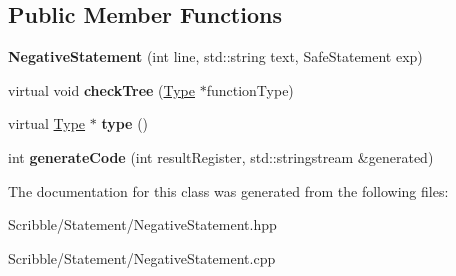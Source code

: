\subsection*{Public Member Functions}
\begin{DoxyCompactItemize}
\item 
\hypertarget{class_negative_statement_af9c7e2ba41fd73279c85fc9e79baed7c}{{\bfseries Negative\-Statement} (int line, std\-::string text, Safe\-Statement exp)}\label{class_negative_statement_af9c7e2ba41fd73279c85fc9e79baed7c}

\item 
\hypertarget{class_negative_statement_a8a3c065290681b616e95f4352cd80147}{virtual void {\bfseries check\-Tree} (\hyperlink{class_type}{Type} $\ast$function\-Type)}\label{class_negative_statement_a8a3c065290681b616e95f4352cd80147}

\item 
\hypertarget{class_negative_statement_a8e73a99aac75464cbbfd42aab913e698}{virtual \hyperlink{class_type}{Type} $\ast$ {\bfseries type} ()}\label{class_negative_statement_a8e73a99aac75464cbbfd42aab913e698}

\item 
\hypertarget{class_negative_statement_a95346e1638e30020bec7b7faad705a89}{int {\bfseries generate\-Code} (int result\-Register, std\-::stringstream \&generated)}\label{class_negative_statement_a95346e1638e30020bec7b7faad705a89}

\end{DoxyCompactItemize}


The documentation for this class was generated from the following files\-:\begin{DoxyCompactItemize}
\item 
Scribble/\-Statement/Negative\-Statement.\-hpp\item 
Scribble/\-Statement/Negative\-Statement.\-cpp\end{DoxyCompactItemize}

